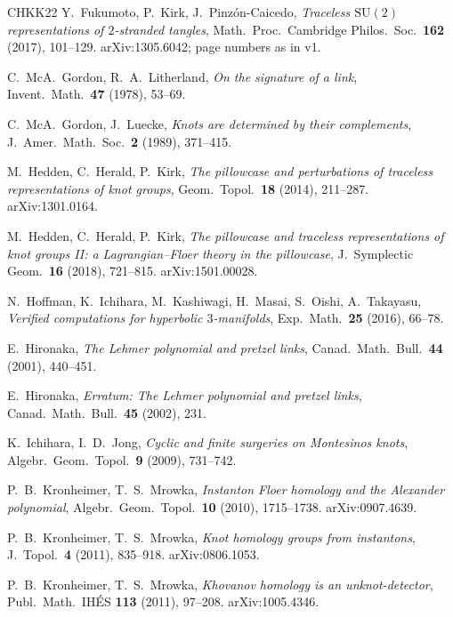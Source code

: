 \documentclass[11pt,reqno]{amsart}
\theoremstyle{plain}
\theoremstyle{definition}
\newcommand{\SU}{\mathrm{SU}(2)}
\numberwithin{equation}{section}
\begin{document}
\begin{thebibliography}{CHKK22}
 Y.~Fukumoto, P.~Kirk, J.~Pinz\'on-Caicedo, \emph{Traceless $\SU$ representations of
$2$-stranded tangles}, Math.\ Proc.\ Cambridge Philos.\ Soc.\ \textbf{162} (2017), 101--129. arXiv:1305.6042; page
numbers as in v1.

 C.~McA.~Gordon, R.~A.~Litherland, \emph{On the signature of a link},
Invent.\ Math.\ \textbf{47} (1978), 53--69.

 C.~McA.~Gordon, J.~Luecke, \emph{Knots are determined by their complements},
J.\ Amer.\ Math.\ Soc.\ \textbf{2} (1989), 371--415.

 M.~Hedden, C.~Herald, P.~Kirk, \emph{The pillowcase and perturbations of traceless
representations of knot groups}, Geom.\ Topol.\ \textbf{18} (2014), 211--287. arXiv:1301.0164.

 M.~Hedden, C.~Herald, P.~Kirk, \emph{The pillowcase and traceless representations of
knot groups II: a Lagrangian--Floer theory in the pillowcase}, J.\ Symplectic Geom.\ \textbf{16}
(2018), 721--815. arXiv:1501.00028.

 N.~Hoffman, K.~Ichihara, M.~Kashiwagi, H.~Masai, S.~Oishi, A.~Takayasu, \emph{Verified computations
for hyperbolic $3$-manifolds}, Exp.\ Math.\ \textbf{25} (2016), 66--78.

 E.~Hironaka, \emph{The Lehmer polynomial and pretzel links}, Canad.\ Math.\ Bull.\
\textbf{44} (2001), 440--451.

 E.~Hironaka, \emph{Erratum: The Lehmer polynomial and pretzel links},
Canad.\ Math.\ Bull.\ \textbf{45} (2002), 231.

 K.~Ichihara, I.~D.~Jong, \emph{Cyclic and finite surgeries on Montesinos knots},
Algebr.\ Geom.\ Topol.\ \textbf{9} (2009), 731--742.

 P.~B.~Kronheimer, T.~S.~Mrowka, \emph{Instanton Floer homology and the
Alexander polynomial}, Algebr.\ Geom.\ Topol.\ \textbf{10} (2010), 1715--1738. arXiv:0907.4639.

 P.~B.~Kronheimer, T.~S.~Mrowka, \emph{Knot homology groups from instantons}, J.\ Topol.\
\textbf{4} (2011), 835--918. arXiv:0806.1053.

 P.~B.~Kronheimer, T.~S.~Mrowka, \emph{Khovanov homology is an unknot-detector}, Publ.\ Math.\
IH\'ES \textbf{113} (2011), 97--208. arXiv:1005.4346.


\end{thebibliography}
\end{document}
